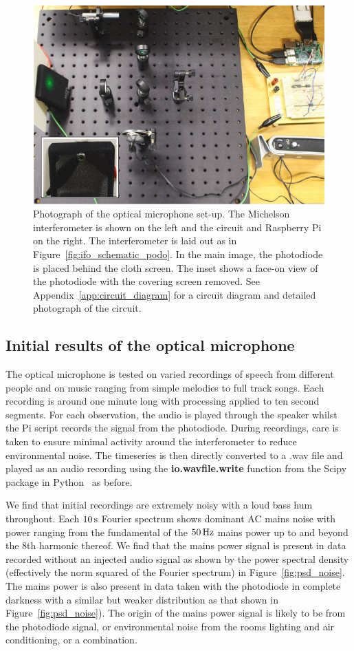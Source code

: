 \documentclass[paper-main.tex]{subfiles}
\begin{document}
\begin{figure}
	\includegraphics[width=.6\textwidth]{figures/setup_pic2.pdf}
\caption{Photograph of the optical microphone set-up. The Michelson interferometer is shown on the left and the circuit and Raspberry Pi on the right. The interferometer is laid out as in Figure~\ref{fig:ifo_schematic_podo}. In the main image, the photodiode is placed behind the cloth screen. The inset shows a face-on view of the photodiode with the covering screen removed. See Appendix~\ref{app:circuit_diagram} for a circuit diagram and detailed photograph of the circuit.}
	\label{fig:setup_pic2}
\end{figure}


\subsection{Initial results of the optical microphone}
\label{sec:initialResultsOpMic}

The optical microphone is tested on varied recordings of speech from different people and on music ranging from simple melodies to full track songs. 
Each recording is around one minute long with processing applied to ten second segments. 
For each observation, the audio is played through the speaker whilst the Pi script records the signal from the photodiode. 
During recordings, care is taken to ensure minimal activity around the interferometer to reduce environmental noise. 
The timeseries is then directly converted to a .wav file and played as an audio recording using the \textbf{io.wavfile.write} function from the Scipy~\cite{scipy} package in Python~\cite{python} as before.

We find that initial recordings are extremely noisy with a loud bass hum throughout.
Each $10\,{\rm s}$ Fourier spectrum shows dominant AC mains noise with power ranging from the fundamental of the $50\,{\rm Hz}$ mains power up to and beyond the $8$th harmonic thereof.
We find that the mains power signal is present in data recorded without an injected audio signal as shown by the power spectral density (effectively the norm squared of the Fourier spectrum) in Figure~\ref{fig:psd_noise}.
The mains power is also present in data taken with the photodiode in complete darkness with a similar but weaker distribution as that shown in Figure~\ref{fig:psd_noise}).
The origin of the mains power signal is likely to be from the photodiode signal, or environmental noise from the rooms lighting and air conditioning, or a combination. 
\end{document}
